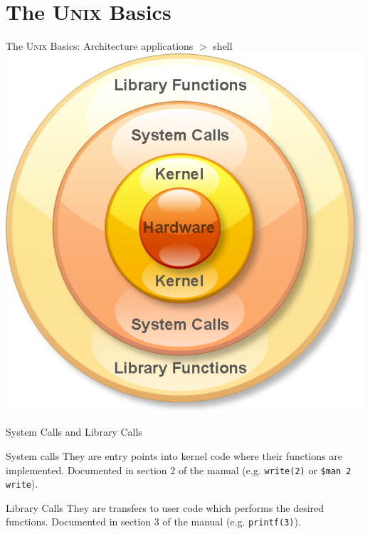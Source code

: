 \documentclass[newPxFont,sthlmFooter,nooffset]{beamer}
\begin{document}
\section{The \textsc{Unix} Basics}

\begin{frame}[t]{The \textsc{Unix} Basics: Architecture}
applications $>$ shell
\bigskip
~
\centering
\includegraphics[height=0.85\textheight]{./figure/System-Call-and-Library-Function.png}
\end{frame}



\begin{frame}[t]{System Calls and Library Calls}
\begin{block}{System calls}
They are entry points into kernel code where their functions are implemented.  Documented in section 2 of the manual (e.g. \texttt{write(2)} or \texttt{\$man 2 write}).
\end{block}
\bigskip

\begin{block}{Library Calls}
They are transfers to user code which performs the desired functions. Documented in section 3 of the manual (e.g. \texttt{printf(3)}).
\end{block}
\end{frame}
\end{document}
